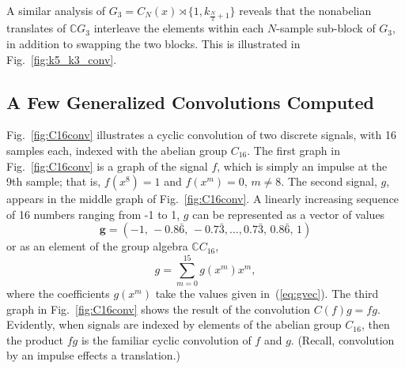 \documentclass[reqno,onecolumn,oneside]{paper}
\newcommand{\<}{\ensuremath{\langle}}
\renewcommand{\>}{\ensuremath{\rangle}}
\newcommand{\sdp}{\ensuremath{\rtimes}}
\newcommand{\field}[1]{\ensuremath{\mathbb{#1}}}
\newcommand{\C}{\field{C}}                   %
\newcommand{\ga}[1]{\ensuremath{\C #1}} %
\newcommand{\CG}{\ga{G}}                %
\begin{document}
\begin{example}
A similar analysis of $G_3 = C_N(x) \sdp \{1,
k_{\frac{N}{2} + 1}\}$ reveals
that the nonabelian translates of $\CG_3$ interleave the 
elements within each $N$-sample sub-block of $G_3$, 
in addition to swapping the two blocks.
This is illustrated in Fig.~\ref{fig:k5_k3_conv}.
\end{example}

\subsection{A Few Generalized Convolutions Computed}

Fig.~\ref{fig:C16conv} illustrates a cyclic
convolution of two discrete signals, with 16 samples each, 
indexed with the abelian group $C_{16}$. 
The first graph in Fig.~\ref{fig:C16conv} is a graph of the
signal $f$, which is simply an impulse at the 9th sample; that is,
$f(x^8) = 1$ and 
$f(x^m) = 0, \, m\neq 8$.
The second signal, $g$, appears in the middle graph of
Fig.~\ref{fig:C16conv}.  A linearly increasing sequence
of 16 numbers ranging from -1 to 1, $g$ can be represented
as a vector of values
\begin{equation}
  \label{eq:gvec}
\mathbf{g} = 
(-1, \, -0.8\bar{6}, \, -0.7\bar{3}, \ldots,
0.7\bar{3}, \, 0.8\bar{6}, \, 1)
\end{equation}
or as an element of the group algebra $\C C_{16}$,
\[
g = \sum_{m=0}^{15} g(x^m) x^m,
\]
where the coefficients $g(x^m)$ take the values given
in~(\ref{eq:gvec}).  The third graph in
Fig.~\ref{fig:C16conv} shows the result of the convolution
$C(f)g = fg$.    Evidently, when signals are indexed by
elements of the abelian group $C_{16}$, then the product $fg$
is the familiar cyclic convolution of $f$ and $g$. (Recall,
convolution by an impulse effects a translation.)
\end{document}
